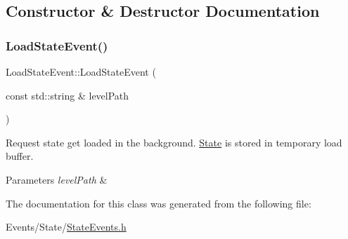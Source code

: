 \subsection{Constructor \& Destructor Documentation}
\mbox{\label{classLoadStateEvent_a01b3f0b41f4f78df73b2d54255560120}} 
\subsubsection{\texorpdfstring{Load\+State\+Event()}{LoadStateEvent()}}
{\footnotesize\ttfamily Load\+State\+Event\+::\+Load\+State\+Event (\begin{DoxyParamCaption}\item[{const std\+::string \&}]{level\+Path }\end{DoxyParamCaption})\hspace{0.3cm}{\ttfamily [inline]}}



Request state get loaded in the background. \hyperlink{classState}{State} is stored in temporary load buffer. 


\begin{DoxyParams}{Parameters}
{\em level\+Path} & \\
\hline
\end{DoxyParams}


The documentation for this class was generated from the following file\+:\begin{DoxyCompactItemize}
\item 
Events/\+State/\hyperlink{StateEvents_8h}{State\+Events.\+h}\end{DoxyCompactItemize}
